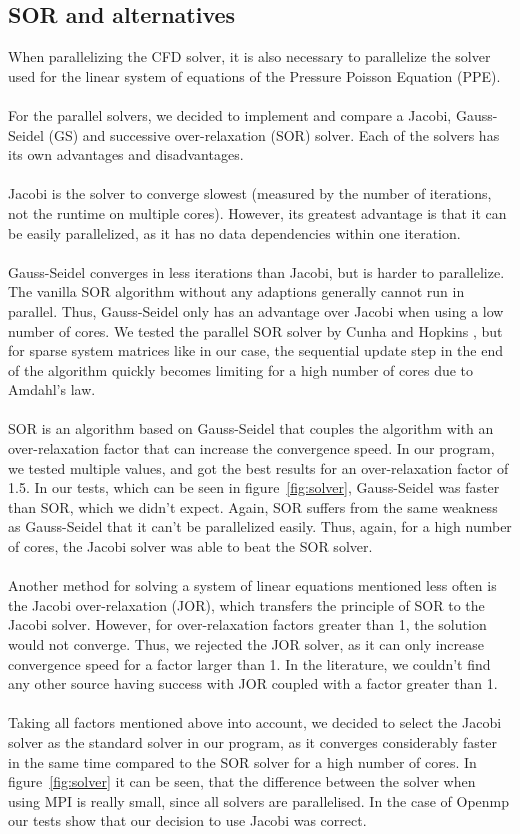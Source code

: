 \documentclass{article}%
\begin{document}
\subsection{SOR and alternatives}
When parallelizing the CFD solver, it is also necessary to parallelize the solver used for the linear system of equations of the Pressure Poisson Equation (PPE).\\
\\
For the parallel solvers, we decided to implement and compare a Jacobi, Gauss-Seidel (GS) and successive over-relaxation (SOR) solver. Each of the solvers has its own advantages and disadvantages.\\
\\
Jacobi is the solver to converge slowest (measured by the number of iterations, not the runtime on multiple cores). However, its greatest advantage is that it can be easily parallelized, as it has no data dependencies within one iteration.\\
\\
Gauss-Seidel converges in less iterations than Jacobi, but is harder to parallelize. The vanilla SOR algorithm without any adaptions generally cannot run in parallel. Thus, Gauss-Seidel only has an advantage over Jacobi when using a low number of cores. We tested the parallel SOR solver by Cunha and Hopkins \cite{parallel-sor}, but for sparse system matrices like in our case, the sequential update step in the end of the algorithm quickly becomes limiting for a high number of cores due to Amdahl’s law.\\
\\
SOR is an algorithm based on Gauss-Seidel that couples the algorithm with an over-relaxation factor that can increase the convergence speed. In our program, we tested multiple values, and got the best results for an over-relaxation factor of 1.5. In our tests, which can be seen in figure~\ref{fig:solver}, Gauss-Seidel was faster than SOR, which we didn't expect. Again, SOR suffers from the same weakness as Gauss-Seidel that it can’t be parallelized easily. Thus, again, for a high number of cores, the Jacobi solver was able to beat the SOR solver.\\
\\
Another method for solving a system of linear equations mentioned less often is the Jacobi over-relaxation (JOR), which transfers the principle of SOR to the Jacobi solver. However, for over-relaxation factors greater than 1, the solution would not converge. Thus, we rejected the JOR solver, as it can only increase convergence speed for a factor larger than 1. In the literature, we couldn’t find any other source having success with JOR coupled with a factor greater than 1.\\
\\
Taking all factors mentioned above into account, we decided to select the Jacobi solver as the standard solver in our program, as it converges considerably faster in the same time compared to the SOR solver for a high number of cores. In figure~\ref{fig:solver} it can be seen, that the difference between the solver when using MPI is really small, since all solvers are parallelised. In the case of Openmp our tests show that our decision to use Jacobi was correct.
\end{document}
